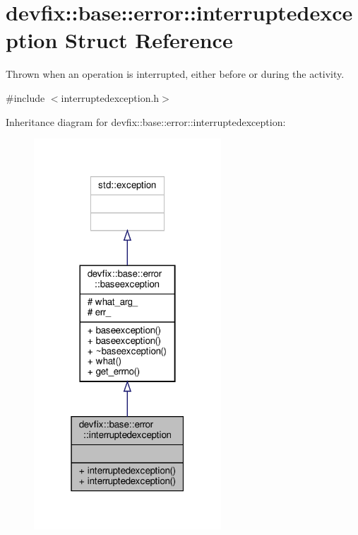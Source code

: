 \hypertarget{structdevfix_1_1base_1_1error_1_1interruptedexception}{}\section{devfix\+:\+:base\+:\+:error\+:\+:interruptedexception Struct Reference}
\label{structdevfix_1_1base_1_1error_1_1interruptedexception}


Thrown when an operation is interrupted, either before or during the activity.  




{\ttfamily \#include $<$interruptedexception.\+h$>$}



Inheritance diagram for devfix\+:\+:base\+:\+:error\+:\+:interruptedexception\+:\nopagebreak
\begin{figure}[H]
\begin{center}
\leavevmode
\includegraphics[width=199pt]{structdevfix_1_1base_1_1error_1_1interruptedexception__inherit__graph}
\end{center}
\end{figure}


